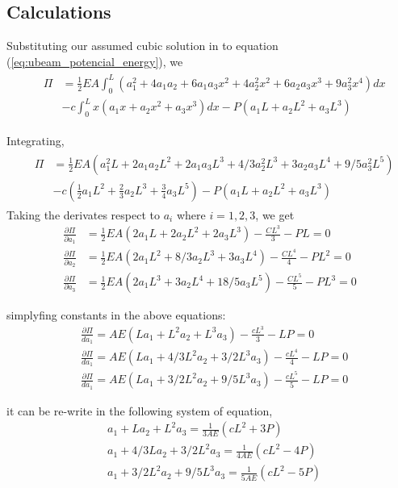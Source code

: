 \documentclass[a4paper]{memoir}
\begin{document}
\subsection{Calculations}
Substituting our assumed cubic solution in to equation (\ref{eq:ubeam_potencial_energy}), we 
\begin{align*}
	&
	\begin{split}
	\Pi &= \frac{1}{2} EA \int^L_0 (a_1^2+4a_1a_2+6a_1a_3x^2+4a_2^2x^2+6a_2a_3x^3+9a_3^2x^4)dx \\ 
			&- c \int^L_0 x(a_1x+a_2x^2+a_3x^3)dx - P(a_1L+a_2L^2+a_3L^3)
	\end{split}
\end{align*}

Integrating,
\begin{align*}
	&
	\begin{split}
	\Pi &= \frac{1}{2} EA (a_1^2L+2a_1a_2L^2+2a_1a_3L^3+4/3a_2^2L^3+3a_2a_3L^4+9/5a_3^2L^5) \\
			&- c(\frac{1}{2}a_1L^2+\frac{2}{3}a_2L^3+\frac{3}{4}a_3L^5) - P(a_1L+a_2L^2+a_3L^3)
	\end{split} 
\end{align*} 
Taking the derivates respect to $a_i$ where $i = 1,2,3$, we get
\begin{align*}
	\frac{\partial \Pi}{\partial a_1} &=	\frac{1}{2} EA (2a_1L+2a_2L^2+2a_3L^3) - \frac{CL^3}{3} - PL = 0 \\
	\frac{\partial \Pi}{\partial a_2} &=	\frac{1}{2} EA (2a_1L^2+8/3a_2L^3+3a_3L^4) - \frac{CL^4}{4} - PL^2 = 0 \\
	\frac{\partial \Pi}{\partial a_3} &=	\frac{1}{2} EA (2a_1L^3+3a_2L^4+18/5a_3L^5) - \frac{CL^5}{5} - PL^3 = 0 
\end{align*}
		
simplyfing constants in the above equations: 
\begin{align*}
	&\frac{\partial \Pi}{da_1} = AE(La_1+L^2a_2+L^3a_3) - \frac{cL^3}{3} - LP = 0 \\
	&\frac{\partial \Pi}{da_1} = AE(La_1+4/3L^2a_2+3/2L^3a_3) - \frac{cL^4}{4} - LP = 0 \\
	&\frac{\partial \Pi}{da_1} = AE(La_1+3/2L^2a_2+9/5L^3a_3) - \frac{cL^5}{5} - LP = 0 
\end{align*}

it can be re-write in the following system of equation,
\begin{align*}
	&a_1+La_2+L^2a_3= \frac{1}{3AE} (cL^2+3P) \\
	&a_1+4/3La_2+3/2L^2a_3 = \frac{1}{4AE} (cL^2-4P) \\
 	&a_1+3/2L^2a_2+9/5L^3a_3 = \frac{1}{5AE} (cL^2-5P)
\end{align*}
\end{document}
